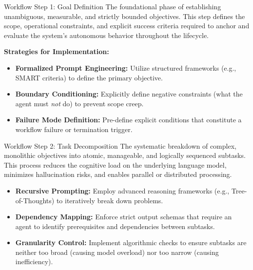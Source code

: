 \documentclass[
11pt,notheorems,hyperref={pdfauthor=whatever}
]{beamer}
\begin{document}
\begin{frame}{Workflow Step 1: Goal Definition}
	The foundational phase of establishing unambiguous, measurable, and strictly bounded objectives. This step defines the scope, operational constraints, and explicit success criteria required to anchor and evaluate the system's autonomous behavior throughout the lifecycle.
	
	\vspace{0.3cm}
	\textbf{Strategies for Implementation:}
	\begin{itemize}
		\item \textbf{Formalized Prompt Engineering:} Utilize structured frameworks (e.g., SMART criteria) to define the primary objective.
		\item \textbf{Boundary Conditioning:} Explicitly define negative constraints (what the agent must \textit{not} do) to prevent scope creep.
		\item \textbf{Failure Mode Definition:} Pre-define explicit conditions that constitute a workflow failure or termination trigger.
	\end{itemize}
\end{frame}

\begin{frame}{Workflow Step 2: Task Decomposition}
	The systematic breakdown of complex, monolithic objectives into atomic, manageable, and logically sequenced subtasks. This process reduces the cognitive load on the underlying language model, minimizes hallucination risks, and enables parallel or distributed processing.
	
	\vspace{0.3cm}
	
	\begin{itemize}
		\item \textbf{Recursive Prompting:} Employ advanced reasoning frameworks (e.g., Tree-of-Thoughts) to iteratively break down problems.
		\item \textbf{Dependency Mapping:} Enforce strict output schemas that require an agent to identify prerequisites and dependencies between subtasks.
		\item \textbf{Granularity Control:} Implement algorithmic checks to ensure subtasks are neither too broad (causing model overload) nor too narrow (causing inefficiency).
	\end{itemize}
\end{frame}
\end{document}
